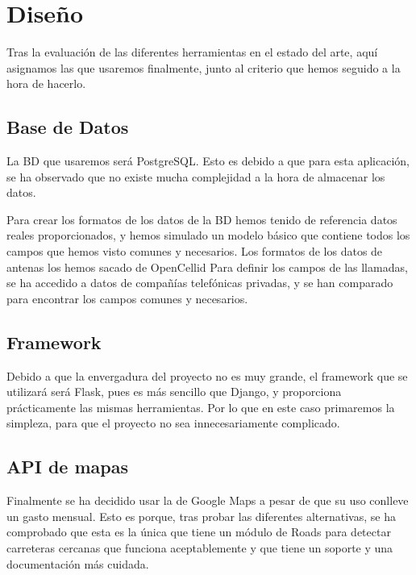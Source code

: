   
\section{Diseño\label{SEC:DISENO}}
  Tras la evaluación de las diferentes herramientas en el estado del arte, aquí asignamos las que usaremos finalmente, junto al criterio que hemos seguido a la hora de hacerlo.
  
  \subsection{Base de Datos}
    La BD que usaremos será PostgreSQL. Esto es debido a que para esta aplicación, se ha observado que no existe mucha complejidad a la hora de almacenar los datos.
    
    Para crear los formatos de los datos de la BD hemos tenido de referencia datos reales proporcionados, y hemos simulado un modelo básico que contiene todos los campos que hemos visto comunes y necesarios.
    Los formatos de los datos de antenas los hemos sacado de OpenCellid \cite{opencellid}
    Para definir los campos de las llamadas, se ha accedido a datos de compañías telefónicas privadas, y se han comparado para encontrar los campos comunes y necesarios.
    

    
    
  \subsection{Framework}
    Debido a que la envergadura del proyecto no es muy grande, el framework que se utilizará será Flask, pues es más sencillo que Django, y proporciona prácticamente las mismas herramientas. Por lo que en este caso primaremos la simpleza, para que el proyecto no sea innecesariamente complicado.

  \subsection{API de mapas}
    Finalmente se ha decidido usar la  de Google Maps\cite{gmaps} a pesar de que su uso conlleve un gasto mensual. Esto es porque, tras probar las diferentes alternativas, se ha comprobado que esta  es la única que tiene un módulo de Roads para detectar carreteras cercanas que funciona aceptablemente y que tiene un soporte y una documentación más cuidada.
    
